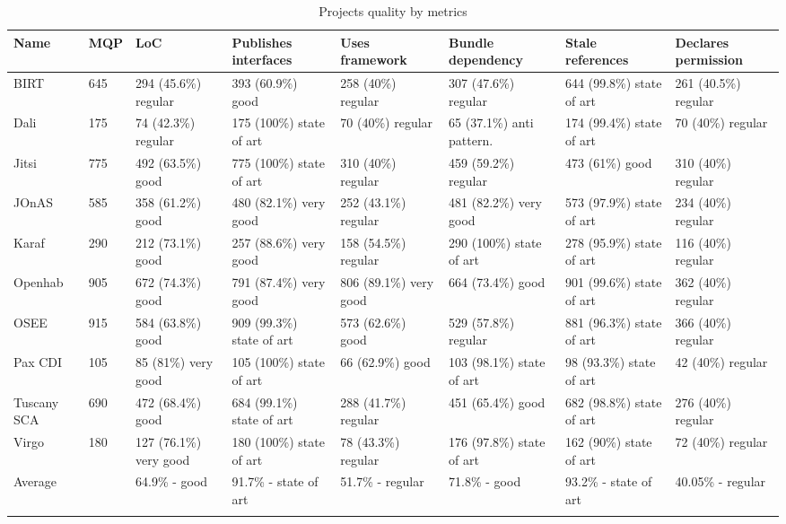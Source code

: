\begin{table}[h]
\tiny
\caption{Projects quality by metrics}
\label{projects-metrics-quality}
    \begin{tabular}{  p{} | p{} | p{2cm} | p{2cm} | p{2cm} | p{2cm} | p{2cm} | p{} }
    \Xhline{2\arrayrulewidth}
    Name & MQP & LoC & Publishes interfaces & Uses framework & Bundle dependency & Stale references & Declares permission \\  \hline
    BIRT & 645 & 294 (45.6\%) regular & 393 (60.9\%) good& 258 (40\%) regular& 307 (47.6\%) regular& 644 (99.8\%) state of art & 261 (40.5\%) regular\\ \hline
    Dali & 175 & 74 (42.3\%) regular & 175 (100\%) state of art& 70 (40\%) regular & 65 (37.1\%) anti pattern. & 174 (99.4\%) state of art& 70 (40\%) regular\\ \hline
    Jitsi & 775 & 492 (63.5\%) good & 775 (100\%) state of art& 310 (40\%) regular& 459 (59.2\%) regular& 473 (61\%) good& 310 (40\%) regular\\ \hline
    JOnAS & 585 & 358 (61.2\%) good & 480 (82.1\%) very good& 252 (43.1\%) regular& 481 (82.2\%) very good& 573 (97.9\%) state of art& 234 (40\%) regular\\ \hline
    Karaf & 290 & 212 (73.1\%) good & 257 (88.6\%) very good& 158 (54.5\%) regular&  290 (100\%) state of art& 278 (95.9\%) state of art& 116 (40\%) regular\\ \hline
    Openhab & 905 & 672 (74.3\%) good& 791 (87.4\%) very good& 806 (89.1\%) very good&  664 (73.4\%) good& 901 (99.6\%) state of art& 362 (40\%) regular\\ \hline
    OSEE & 915 & 584 (63.8\%) good& 909 (99.3\%) state of art& 573 (62.6\%) good& 529 (57.8\%) regular& 881 (96.3\%) state of art& 366 (40\%) regular\\ \hline
    Pax CDI & 105 & 85 (81\%) very good & 105 (100\%) state of art & 66 (62.9\%) good& 103 (98.1\%) state of art & 98 (93.3\%) state of art& 42 (40\%) regular\\ \hline
    Tuscany SCA & 690 & 472 (68.4\%) good& 684 (99.1\%) state of art & 288 (41.7\%) regular& 451 (65.4\%) good&  682 (98.8\%) state of art& 276 (40\%) regular\\ \hline
    Virgo & 180 & 127 (76.1\%) very good& 180 (100\%) state of art & 78 (43.3\%) regular & 176 (97.8\%) state of art& 162 (90\%) state of art & 72 (40\%) regular\\ \hline
    Average  & & 64.9\% - good & 91.7\% - state of art & 51.7\% - regular  & 71.8\% - good & 93.2\% - state of art & 40.05\% - regular\\
   \Xhline{2\arrayrulewidth}
    \end{tabular}
\end{table}
\FloatBarrier   

